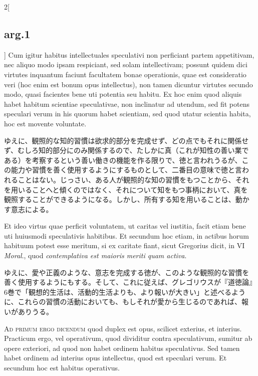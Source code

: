 \documentclass[paper=a4paper,fontsize=10pt,jafontsize=9pt,titlepage]{jlreq}
\begin{document}
\begin{paracol}{2}[\subsection{arg.1}]
Cum igitur habitus intellectuales speculativi non perficiant partem
appetitivam, nec aliquo modo ipsam respiciant, sed solam
intellectivam; possunt quidem dici virtutes inquantum faciunt
facultatem bonae operationis, quae est consideratio veri (hoc enim est
bonum opus intellectus), non tamen dicuntur virtutes secundo modo,
quasi facientes bene uti potentia seu habitu. Ex hoc enim quod aliquis
habet habitum scientiae speculativae, non inclinatur ad utendum, sed
fit potens speculari verum in his quorum habet scientiam, sed quod
utatur scientia habita, hoc est movente voluntate.

\switchcolumn

ゆえに、観照的な知的習慣は欲求的部分を完成せず、どの点でもそれに関係せ
ず、むしろ知的部分にのみ関係するので、たしかに真（これが知性の善い業で
ある）を考察するという善い働きの機能を作る限りで、徳と言われうるが、こ
の能力や習慣を善く使用するようにするものとして、二番目の意味で徳と言わ
れることはない。じっさい、ある人が観照的な知の習慣をもつことから、それ
を用いることへと傾くのではなく、それについて知をもつ事柄において、真を
観照することができるようになる。しかし、所有する知を用いることは、動か
す意志による。

\switchcolumn*

Et ideo virtus quae perficit voluntatem, ut caritas vel iustitia,
facit etiam bene uti huiusmodi speculativis habitibus. Et secundum hoc
etiam, in actibus horum habituum potest esse meritum, si ex caritate
fiant, sicut Gregorius dicit, in VI {\itshape Moral}., quod {\itshape
contemplativa est maioris meriti quam activa}.

\switchcolumn

ゆえに、愛や正義のような、意志を完成する徳が、このような観照的な習慣を
善く使用するようにもする。そして、これに従えば、グレゴリウスが『道徳論』
6巻で「観想的生活は、活動的生活よりも、より報いが大きい」と述べるよう
に、これらの習慣の活動においても、もしそれが愛から生じるのであれば、報
いがありうる。

\switchcolumn*[\subsection{ad.1}]

{\scshape Ad primum ergo dicendum} quod duplex est opus, scilicet
exterius, et interius. Practicum ergo, vel operativum, quod dividitur
contra speculativum, sumitur ab opere exteriori, ad quod non habet
ordinem habitus speculativus. Sed tamen habet ordinem ad interius opus
intellectus, quod est speculari verum. Et secundum hoc est habitus
operativus.


\end{paracol}
\end{document}
